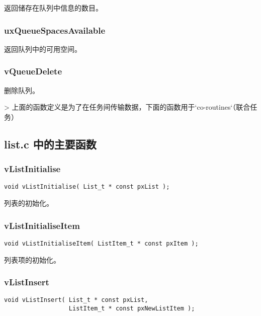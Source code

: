 \documentclass[12pt, a4paper]{article}
\begin{document}
返回储存在队列中信息的数目。

\subsubsection {uxQueueSpacesAvailable}

返回队列中的可用空间。

\subsubsection {vQueueDelete}

删除队列。

> 上面的函数定义是为了在任务间传输数据，下面的函数用于`co-routines`（联合任务）

\subsection {list.c 中的主要函数}

\subsubsection {vListInitialise}

\begin{lstlisting}[language={[ANSI]C},keywordstyle=\color{blue!70},commentstyle=\color{red!50!green!50!blue!50},frame=shadowbox, rulesepcolor=\color{red!20!green!20!blue!20}]
void vListInitialise( List_t * const pxList );
\end{lstlisting}

列表的初始化。

\subsubsection {vListInitialiseItem}

\begin{lstlisting}[language={[ANSI]C},keywordstyle=\color{blue!70},commentstyle=\color{red!50!green!50!blue!50},frame=shadowbox, rulesepcolor=\color{red!20!green!20!blue!20}]
void vListInitialiseItem( ListItem_t * const pxItem );
\end{lstlisting}

列表项的初始化。

\subsubsection {vListInsert}

\begin{lstlisting}[language={[ANSI]C},keywordstyle=\color{blue!70},commentstyle=\color{red!50!green!50!blue!50},frame=shadowbox, rulesepcolor=\color{red!20!green!20!blue!20}]
void vListInsert( List_t * const pxList, 
                  ListItem_t * const pxNewListItem );
\end{lstlisting}
\end{document}
